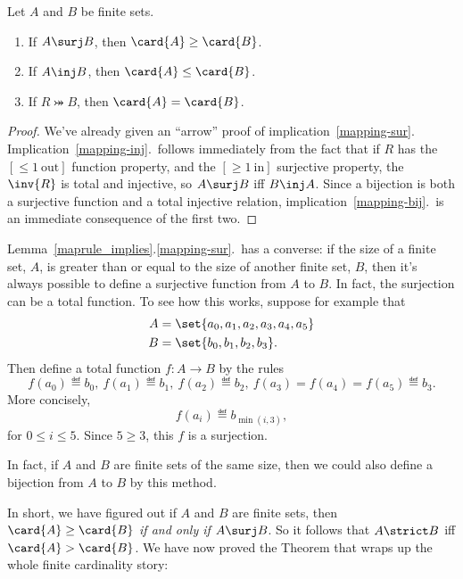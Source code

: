 \begin{lemma}\label{maprule_implies}
Let $A$ and $B$ be finite sets.

\begin{enumerate}

\item\label{mapping-sur} If $A \surj B$, then $\card{A} \geq \card{B}$.

\item\label{mapping-inj} If $A \inj B$, then $\card{A} \leq \card{B}$.

\item\label{mapping-bij} If $R \bij B$, then $\card{A} = \card{B}$.
\end{enumerate}

\end{lemma}

\begin{proof}
  We've already given an ``arrow'' proof of implication~\ref{mapping-sur}.
  Implication~\ref{mapping-inj}.\ follows immediately from the fact that
  if $R$ has the $[\le 1\ \text{out}]$ function property, and the $[\ge 1\
  \text{in}]$ surjective property, the $\inv{R}$ is total and injective,
  so $A \surj B$ iff $B \inj A$.  Since a bijection is both a surjective
  function and a total injective relation, implication~\ref{mapping-bij}.\
  is an immediate consequence of the first two.
\end{proof}

Lemma~\ref{maprule_implies}.\ref{mapping-sur}.\ has a converse:
if the size of a finite set, $A$, is greater than or equal to the size of
another finite set, $B$, then it's always possible to define a
surjective function from $A$ to $B$.  In fact, the surjection can be a
total function.  To see how this works, suppose for example that
\begin{align*}
A & =\set{a_0,a_1,a_2,a_3,a_4,a_5}\\
B & =\set{b_0,b_1,b_2,b_3}.
\end{align*}
Then define a total function $f:A\to B$ by the rules
\[
f(a_0) \eqdef b_0,\  f(a_1) \eqdef b_1,\  f(a_2) \eqdef b_2,\  f(a_3)=
f(a_4)=f(a_5) \eqdef b_3.
\]
More concisely,
\[
f(a_i) \eqdef b_{\min(i,3)},
\]
for $0 \le i \le 5$.  Since $5 \geq 3$, this $f$ is a surjection.

In fact, if $A$ and $B$ are finite sets of the same size, then we could also
define a bijection from $A$ to $B$ by this method.

In short, we have figured out if $A$ and $B$ are finite sets, then
$\card{A} \geq \card{B}$ \emph{if and only if} $A \surj B$.  So it follows
that $A \strict B$ iff $\card{A} > \card{B}$.  We have now proved the
Theorem that wraps up the whole finite cardinality story:

